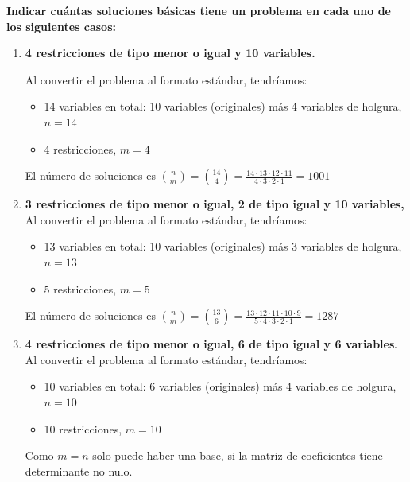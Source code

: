 \textbf{Indicar cuántas soluciones básicas tiene un problema en cada uno de los siguientes casos:}
\begin{enumerate}[label=\alph*)]
    \item \textbf{4 restricciones de tipo menor o igual y 10 variables.}

    Al convertir el problema al formato estándar, tendríamos:
    \begin{itemize}
        \item 14 variables en total: 10 variables (originales) más 4 variables de holgura, $n=14$
        \item 4 restricciones, $m=4$
    \end{itemize}
    El número de soluciones es $\binom{n}{m}=\binom{14}{4} = \frac{ 14 \cdot 13 \cdot  12  \cdot 11}{4 \cdot 3 \cdot 2 \cdot 1}=1001$
        
    \item \textbf{3 restricciones de tipo menor o igual, 2 de tipo igual y 10 variables,}
    Al convertir el problema al formato estándar, tendríamos:
    \begin{itemize}
        \item 13 variables en total: 10 variables (originales) más 3 variables de holgura, $n=13$
        \item 5 restricciones, $m=5$
    \end{itemize}    
    El número de soluciones es $\binom{n}{m}=\binom{13}{6} = \frac{13 \cdot  12  \cdot 11 \cdot 10 \cdot 9 }{ 5 \cdot 4 \cdot 3 \cdot 2 \cdot 1}=1287$
    
    \item \textbf{4 restricciones de tipo menor o igual, 6 de tipo igual y 6 variables.}
    Al convertir el problema al formato estándar, tendríamos:
    \begin{itemize}
        \item 10 variables en total: 6 variables (originales) más 4 variables de holgura, $n=10$
        \item 10 restricciones, $m=10$
    \end{itemize}
    Como $m = n$ solo puede haber una base, si la matriz de coeficientes tiene determinante no nulo.
\end{enumerate}